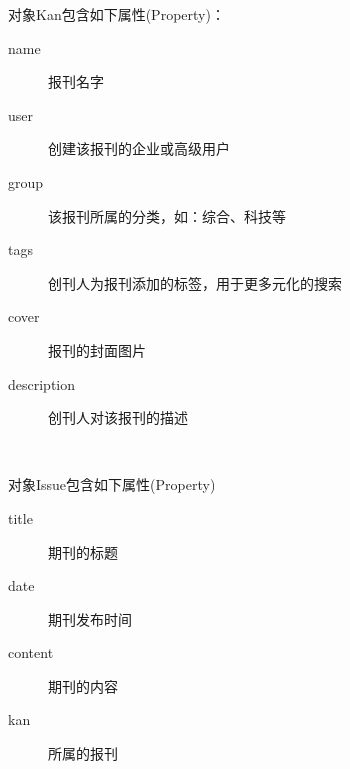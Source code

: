 \noindent
对象Kan包含如下属性(Property)：
\begin{description}
	\item[name] 报刊名字
	\item[user] 创建该报刊的企业或高级用户
	\item[group] 该报刊所属的分类，如：综合、科技等
	\item[tags] 创刊人为报刊添加的标签，用于更多元化的搜索
	\item[cover] 报刊的封面图片
	\item[description] 创刊人对该报刊的描述
\end{description}
\par~

\noindent
对象Issue包含如下属性(Property)
\begin{description}
	\item[title] 期刊的标题
	\item[date]  期刊发布时间
	\item[content] 期刊的内容
	\item[kan] 所属的报刊
\end{description}
\par~

\clearpage






